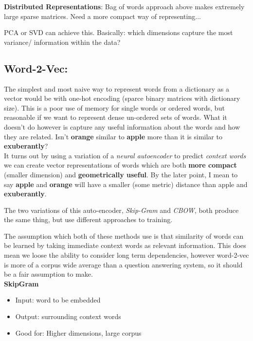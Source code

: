 \documentclass[]{article}
\begin{document}
    
    
      \textbf{Distributed Representations}: Bag of words approach above makes extremely large sparse matrices. Need a more compact way of representing...
     
     PCA or SVD can achieve this. Basically: which dimensions capture the most variance/ information within the data? \\
     
     \subsection{Word-2-Vec:}
     
     The simplest and most naive way to represent words from a dictionary as a vector would be with one-hot encoding (sparce binary matrices with dictionary size). This is a poor use of memory for single words or ordered words, but reasonable if we want to represent dense un-ordered sets of words. What it doesn't do however is capture any useful information about the words and how they are related. Isn't \textbf{orange} similar to \textbf{apple} more than it is similar to \textbf{exuberantly}? \\
     
     It turns out by using a variation of a \textit{neural autoencoder} to predict \textit{context words} we can create vector representations of words which are both \textbf{more compact } (smaller dimension) and \textbf{geometrically useful}. By the later point, I mean to say \textbf{apple} and \textbf{orange} will have a smaller (some metric) distance than apple and \textbf{exuberantly}.
     
     The two variations of this auto-encoder, \textit{Skip-Gram} and \textit{CBOW}, both produce the same thing, but use different approaches to training.
     
     The assumption which both of these methods use is that similarity of words can be learned by taking immediate context words as relevant information. This does mean we loose the ability to consider long term dependencies, however word-2-vec is more of a corpus wide average than a question answering system, so it should be a fair assumption to make. \\
     
     \textbf{SkipGram}
     \begin{itemize}
      \item Input: word to be embedded
      \item Output: surrounding context words
      \item Good for: Higher dimensions, large corpus
     \end{itemize}
\end{document}
